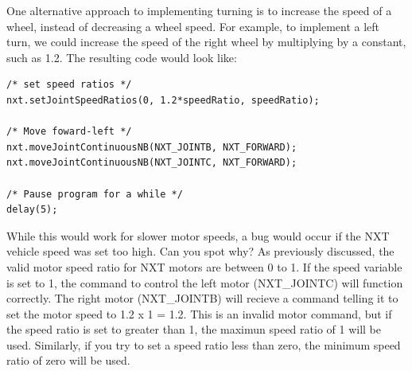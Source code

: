 \documentclass[11pt]{article}
\begin{document}
One alternative approach to implementing turning is to increase the speed of a 
wheel, instead of decreasing a wheel speed. For example, to implement a left 
turn, we could increase the speed of the right wheel by multiplying by a constant, 
such as 1.2.  The resulting code would look like:
\begin{lstlisting}
/* set speed ratios */
nxt.setJointSpeedRatios(0, 1.2*speedRatio, speedRatio);

/* Move foward-left */
nxt.moveJointContinuousNB(NXT_JOINTB, NXT_FORWARD);
nxt.moveJointContinuousNB(NXT_JOINTC, NXT_FORWARD);

/* Pause program for a while */
delay(5);
\end{lstlisting}
While this would work for slower motor speeds, a bug would occur if the NXT 
vehicle speed was set too high. Can you spot why? As previously discussed, the 
valid motor speed ratio for NXT motors are between 0 to 1. If the speed variable 
is set to 1, the command to control the left motor (NXT\_JOINTC) will function 
correctly. The right motor (NXT\_JOINTB) will recieve a command telling it to 
set the motor speed to 1.2 x 1 = 1.2. This is an invalid motor command, but if 
the speed ratio is set to greater than 1, the maximun speed ratio of 1 will be
used. Similarly, if you try to set a speed ratio less than zero, the minimum 
speed ratio of zero will be used.
\end{document}

